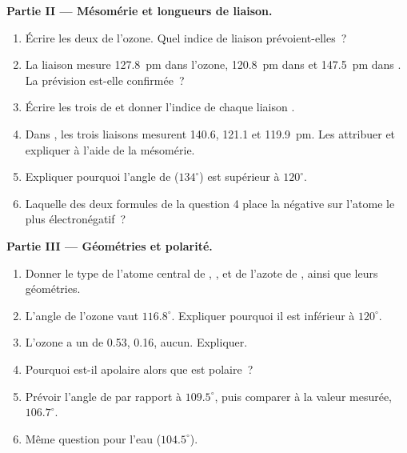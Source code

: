 \begin{problem}
\medskip
\noindent\textbf{Partie II --- Mésomérie et longueurs de liaison.}
\begin{enumerate}[resume]
  \item Écrire les deux  de l'ozone. Quel indice de
        liaison prévoient-elles~?
  \item La liaison  mesure \qty{127.8}{pm} dans l'ozone,
        \qty{120.8}{pm} dans  et \qty{147.5}{pm} dans .
        La prévision est-elle confirmée~?
  \item Écrire les trois  de  et donner
        l'indice de chaque liaison .
  \item Dans , les trois liaisons  mesurent 140.6, 121.1
        et \qty{119.9}{pm}. Les attribuer et expliquer à l'aide de la
        mésomérie.
  \item Expliquer pourquoi l'angle  de  ($134^\circ$)
        est supérieur à $120^\circ$.
  \item Laquelle des deux formules de la question 4 place la  négative sur l'atome le plus électronégatif~?
\end{enumerate}

\medskip
\noindent\textbf{Partie III --- Géométries et polarité.}
\begin{enumerate}[resume]
  \item Donner le type  de l'atome central de ,
        ,  et de l'azote de , ainsi que leurs
        géométries.
  \item L'angle de l'ozone vaut $116.8^\circ$. Expliquer pourquoi il est
        inférieur à $120^\circ$.
  \item L'ozone a un  de \qty{0.53}{\debye}, 
        \qty{0.16}{\debye},  aucun. Expliquer.
  \item Pourquoi  est-il apolaire alors que  est polaire~?
  \item Prévoir l'angle de  par rapport à $109.5^\circ$, puis
        comparer à la valeur mesurée, $106.7^\circ$.
  \item Même question pour l'eau ($104.5^\circ$).
\end{enumerate}


\end{problem}
